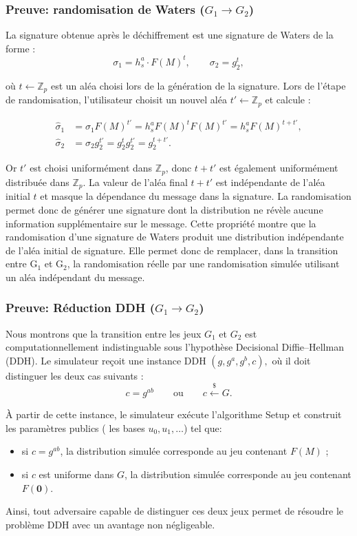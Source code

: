\subsubsection{Preuve: randomisation de Waters ($G_1 \rightarrow G_2$)}
\label{sec:randomisation-waters}

La signature obtenue après le déchiffrement est une signature de Waters
de la forme :
\[
\sigma_1 = h_s^a \cdot F(M)^t,
\qquad
\sigma_2 = g_2^t,
\]

où $t\leftarrow\mathbb{Z}_p$ est un aléa choisi lors de la génération de la
signature.
Lors de l'étape de randomisation, l'utilisateur choisit un nouvel aléa
$t'\leftarrow\mathbb{Z}_p$ et calcule :

\[
\begin{aligned}
\widehat{\sigma}_1 &= \sigma_1 F(M)^{t'}
= h_s^a F(M)^t F(M)^{t'}
= h_s^a F(M)^{t+t'},\\
\widehat{\sigma}_2 &= \sigma_2 g_2^{t'}
= g_2^t g_2^{t'}
= g_2^{t+t'}.
\end{aligned}
\]

Or $t'$ est choisi uniformément dans $\mathbb{Z}_p$, donc
$t+t'$ est également uniformément distribuée dans $\mathbb{Z}_p$.
La valeur de l'aléa final $t+t'$ est indépendante de l'aléa
initial $t$ et masque la dépendance du message dans la signature. La
randomisation permet donc de générer une signature dont la distribution ne
révèle aucune information supplémentaire sur le message.
Cette propriété montre que la randomisation d'une signature de Waters
produit une distribution indépendante de l'aléa initial de signature.
Elle permet donc de remplacer, dans la transition entre G$_1$ et G$_2$,
la randomisation réelle par une randomisation simulée utilisant un aléa
indépendant du message.

\subsubsection{Preuve: Réduction DDH ($G_1 \rightarrow G_2$)}
\label{sec:DDH-waters}

Nous montrons que la transition entre les jeux $G_1$ et $G_2$ est
computationnellement indistinguable sous l'hypothèse Decisional
Diffie--Hellman (DDH).
Le simulateur reçoit une instance DDH
$
(g, g^a, g^b, c),
$
où il doit distinguer les deux cas suivants :
\[
c = g^{ab}
\qquad \text{ou} \qquad
c \xleftarrow{\$} G.
\]

À partir de cette instance, le simulateur exécute l'algorithme \textsf{Setup} et construit les paramètres publics ( les bases $u_0, u_1, \ldots$) tel que:
\begin{itemize}
    \item si $c = g^{ab}$, la distribution simulée corresponde au jeu contenant $F(M)$ ;
    \item si $c$ est uniforme dans $G$, la distribution simulée corresponde au jeu contenant $F(\mathbf{0})$.
\end{itemize}

Ainsi, tout adversaire capable de distinguer ces deux jeux permet de résoudre le problème DDH avec un avantage non négligeable.
